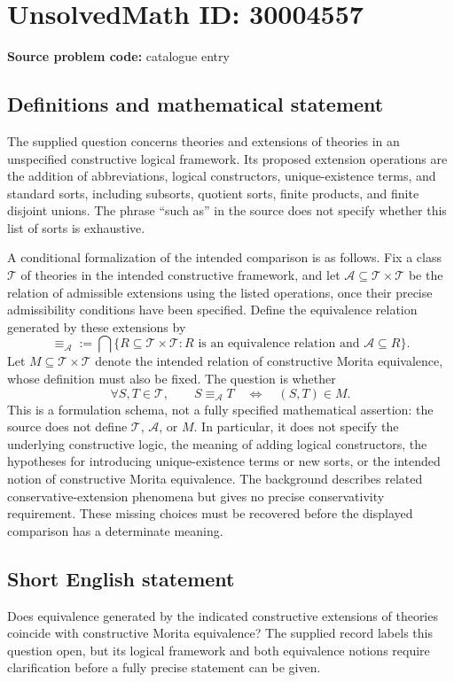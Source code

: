 \documentclass[11pt]{article}
\begin{document}
\section*{UnsolvedMath ID: 30004557}
\textbf{Source problem code:} catalogue entry
\subsection{Definitions and mathematical statement}
The supplied question concerns theories and extensions of theories in an unspecified constructive logical framework. Its proposed extension operations are the addition of abbreviations, logical constructors, unique-existence terms, and standard sorts, including subsorts, quotient sorts, finite products, and finite disjoint unions. The phrase ``such as'' in the source does not specify whether this list of sorts is exhaustive.

A conditional formalization of the intended comparison is as follows. Fix a class \(\mathcal T\) of theories in the intended constructive framework, and let \(\mathcal A\subseteq\mathcal T\times\mathcal T\) be the relation of admissible extensions using the listed operations, once their precise admissibility conditions have been specified. Define the equivalence relation generated by these extensions by
\[
\equiv_{\mathcal A}
:=
\bigcap\{R\subseteq\mathcal T\times\mathcal T:
R\text{ is an equivalence relation and }\mathcal A\subseteq R\}.
\]
Let \(M\subseteq\mathcal T\times\mathcal T\) denote the intended relation of constructive Morita equivalence, whose definition must also be fixed. The question is whether
\[
\forall S,T\in\mathcal T,\qquad
S\equiv_{\mathcal A}T
\quad\Longleftrightarrow\quad
(S,T)\in M.
\]
This is a formulation schema, not a fully specified mathematical assertion: the source does not define \(\mathcal T\), \(\mathcal A\), or \(M\). In particular, it does not specify the underlying constructive logic, the meaning of adding logical constructors, the hypotheses for introducing unique-existence terms or new sorts, or the intended notion of constructive Morita equivalence. The background describes related conservative-extension phenomena but gives no precise conservativity requirement. These missing choices must be recovered before the displayed comparison has a determinate meaning.
\subsection{Short English statement}
Does equivalence generated by the indicated constructive extensions of theories coincide with constructive Morita equivalence? The supplied record labels this question open, but its logical framework and both equivalence notions require clarification before a fully precise statement can be given.
\end{document}
